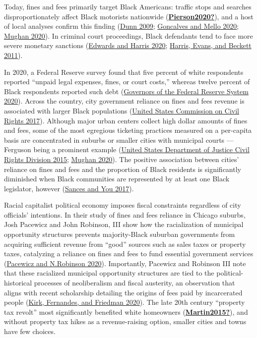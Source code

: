 \documentclass[
  12pt,
]{article}
\begin{document}
Today, fines and fees primarily target Black Americans: traffic stops and searches disproportionately affect Black motorists nationwide (\protect\hyperlink{ref-Pierson2020}{\textbf{Pierson2020?}}), and a host of local analyses confirm this finding (\protect\hyperlink{ref-Dunn2009}{Dunn 2009}; \protect\hyperlink{ref-Goncalves2020}{Goncalves and Mello 2020}; \protect\hyperlink{ref-Mughan2020}{Mughan 2020}). In criminal court proceedings, Black defendants tend to face more severe monetary sanctions (\protect\hyperlink{ref-Edwards2020}{Edwards and Harris 2020}; \protect\hyperlink{ref-Harris2011}{Harris, Evans, and Beckett 2011}).

In 2020, a Federal Reserve survey found that five percent of white respondents reported ``unpaid legal expenses, fines, or court costs,'' whereas twelve percent of Black respondents reported such debt (\protect\hyperlink{ref-BoardofGovernorsoftheFederalReserveSystem2020}{Governors of the Federal Reserve System 2020}). Across the country, city government reliance on fines and fees revenue is associated with larger Black populations (\protect\hyperlink{ref-UnitedStatesCommissiononCivilRights2017}{United States Commission on Civil Rights 2017}). Although major urban centers collect high dollar amounts of fines and fees, some of the most egregious ticketing practices measured on a per-capita basis are concentrated in suburbs or smaller cities with municipal courts --- Ferguson being a prominent example (\protect\hyperlink{ref-UnitedStatesDepartmentofJusticeCivilRightsDivision2015}{United States Department of Justice Civil Rights Division 2015}; \protect\hyperlink{ref-Mughan2020}{Mughan 2020}). The positive association between cities' reliance on fines and fees and the proportion of Black residents is significantly diminished when Black communities are represented by at least one Black legislator, however (\protect\hyperlink{ref-Sances2017}{Sances and You 2017}).

Racial capitalist political economy imposes fiscal constraints regardless of city officials' intentions. In their study of fines and fees reliance in Chicago suburbs, Josh Pacewicz and John Robinson, III show how the racialization of municipal opportunity structures prevents majority-Black suburban governments from acquiring sufficient revenue from ``good'' sources such as sales taxes or property taxes, catalyzing a reliance on fines and fees to fund essential government services (\protect\hyperlink{ref-Pacewicz2020}{Pacewicz and N.Robinson 2020}). Importantly, Pacewicz and Robinson III note that these racialized municipal opportunity structures are tied to the political-historical processes of neoliberalism and fiscal austerity, an observation that aligns with recent scholarship detailing the origins of fees paid by incarcerated people (\protect\hyperlink{ref-Kirk2020}{Kirk, Fernandes, and Friedman 2020}). The late 20th century ``property tax revolt'' most significantly benefited white homeowners (\protect\hyperlink{ref-Martin2015}{\textbf{Martin2015?}}), and without property tax hikes as a revenue-raising option, smaller cities and towns have few choices.
\end{document}
